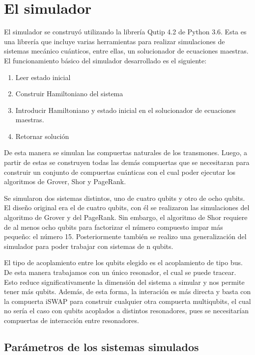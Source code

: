 \chapter{El simulador}

El simulador se construyó utilizando la librería Qutip 4.2 de Python 3.6. Esta es una librería que incluye varias herramientas para realizar simulaciones de sistemas mecánico cuánticos, entre ellas, un solucionador de ecuaciones maestras. El funcionamiento básico del simulador desarrollado es el siguiente:

\begin{enumerate}
    \item Leer estado inicial
    \item Construir Hamiltoniano del sistema
    \item Introducir Hamiltoniano y estado inicial en el solucionador de ecuaciones maestras.
    \item Retornar solución
\end{enumerate}

De esta manera se simulan las compuertas naturales de los transmones. Luego, a partir de estas se construyen todas las demás compuertas que se necesitaran para construir un conjunto de compuertas cuánticas con el cual poder ejecutar los algoritmos de Grover, Shor y PageRank.

Se simularon dos sistemas distintos, uno de cuatro qubits y otro de ocho qubits. El diseño original era el de cuatro qubits, con él se realizaron las simulaciones del algoritmo de Grover y del PageRank. Sin embargo, el algoritmo de Shor requiere de al menos ocho qubits para factorizar el número compuesto impar más pequeño: el número 15. Posteriormente también se realizo una generalización del simulador para poder trabajar con sistemas de n qubits.

El tipo de acoplamiento entre los qubits elegido es el acoplamiento de tipo bus. De esta manera trabajamos con un único resonador, el cual se puede tracear. Esto reduce significativamente la dimensión del sistema a simular y nos permite tener más qubits. Además, de esta forma, la interación es más directa y basta con la compuerta iSWAP para construir cualquier otra compuerta multiqubits, el cual no sería el caso con qubits acoplados a distintos resonadores, pues se necesitarían compuertas de interacción entre resonadores.

\section{Parámetros de los sistemas simulados}

